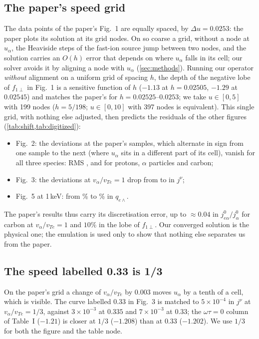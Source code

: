 \documentclass[11pt,a4paper]{article}
\newcommand{\ot}{\omega\tau}
\begin{document}
\subsection{The paper's speed grid}\label{sec:shift}
The data points of the paper's Fig.~1 are equally spaced, by $\Delta u=0.0253$: the paper plots its solution at its grid
nodes. On so coarse a grid, without a node at $u_\alpha$, the Heaviside steps of the fast-ion source jump between two
nodes, and the solution carries an $O(h)$ error that depends on where $u_\alpha$ falls in its cell; our solver avoids it by
aligning a node with $u_\alpha$ (\cref{sec:methods}). Running our operator \emph{without} alignment on a uniform grid of
spacing $h$, the depth of the negative lobe of $f_{1\perp}$ in Fig.~1 is a sensitive function of $h$ ($-1.13$ at
$h=0.02505$, $-1.29$ at $0.02545$) and matches the paper's \FigOneMinPaper{} for $h=0.02525$--$0.0253$; we take $u\in[0,5]$
with 199 nodes ($h=5/198$; $u\in[0,10]$ with 397 nodes is equivalent). This single grid, with nothing else adjusted,
then predicts the residuals of the other figures (\cref{tab:shift,tab:digitized}):
\begin{itemize}
   \item Fig.~2: the deviations at the paper's samples, which alternate in sign from one sample to the next (where
         $u_\alpha$ sits in a different part of its cell), vanish for all three species: RMS \FigTwoRmsGridProton,
         \FigTwoRmsGridAlpha{} and \FigTwoRmsGridCarbon{} for protons, $\alpha$ particles and carbon;
   \item Fig.~3: the deviations at $v_\alpha/v_{Te}=1$ drop from \FigThreeWorstJ{} to \FigThreeGridJ{} in $j^\nu$;
   \item Fig.~5 at 1\,keV: from \FiveWedgeOneEH\% to \FiveWedgeOneGrid\% in $q_{e\wedge}$.
\end{itemize}
The paper's results thus carry its discretisation error, up to $\approx0.04$ in $j^0_{e\alpha}/j^0_\alpha$ for carbon at
$v_\alpha/v_{Te}=1$ and $10\%$ in the lobe of $f_{1\perp}$. Our converged solution is the physical one; the emulation is
used only to show that nothing else separates us from the paper.

\subsection{The speed labelled 0.33 is 1/3}\label{sec:third}
On the paper's grid a change of $v_\alpha/v_{Te}$ by $0.003$ moves $u_\alpha$ by a tenth of a cell, which is visible. The
curve labelled 0.33 in Fig.~3 is matched to $5\times10^{-4}$ in $j^\nu$ at $v_\alpha/v_{Te}=1/3$, against $3\times10^{-3}$ at
$0.335$ and $7\times10^{-3}$ at $0.33$; the $\ot=0$ column of Table~I ($-1.21$) is closer at $1/3$ ($-1.208$) than at $0.33$
($-1.202$). We use $1/3$ for both the figure and the table node.
\end{document}
